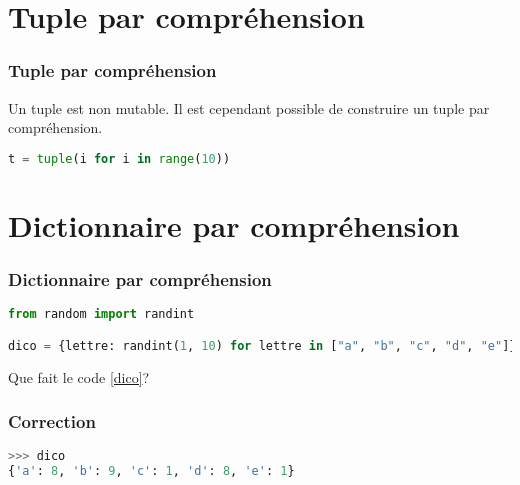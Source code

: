 \documentclass[svgnames,11pt]{beamer}
\begin{document}
\section{Tuple par compréhension}
\begin{frame}[fragile]
    \frametitle{Tuple par compréhension}

    \begin{aretenir}[]
    Un tuple est non mutable. Il est cependant possible de construire un tuple par compréhension.
    \end{aretenir}
\begin{center}
\begin{lstlisting}[language=Python , basicstyle=\ttfamily\small, xleftmargin=2em, xrightmargin=2em]
t = tuple(i for i in range(10))
\end{lstlisting}
\label{CODE}
\end{center}
\end{frame}
\section{Dictionnaire par compréhension}
\begin{frame}[fragile]
    \frametitle{Dictionnaire par compréhension}

    \begin{center}
    \begin{lstlisting}[language=Python , basicstyle=\ttfamily\small, xleftmargin=2em, xrightmargin=2em]
from random import randint

dico = {lettre: randint(1, 10) for lettre in ["a", "b", "c", "d", "e"]}
\end{lstlisting}
    \label{dico}
    \end{center}
\begin{activite}
Que fait le code \ref{dico}?
\end{activite}
\end{frame}
\begin{frame}[fragile]
    \frametitle{Correction}

\begin{lstlisting}[language=Python , basicstyle=\ttfamily\small, xleftmargin=2em, xrightmargin=2em]
>>> dico
{'a': 8, 'b': 9, 'c': 1, 'd': 8, 'e': 1}
\end{lstlisting}

\end{frame}
\end{document}
